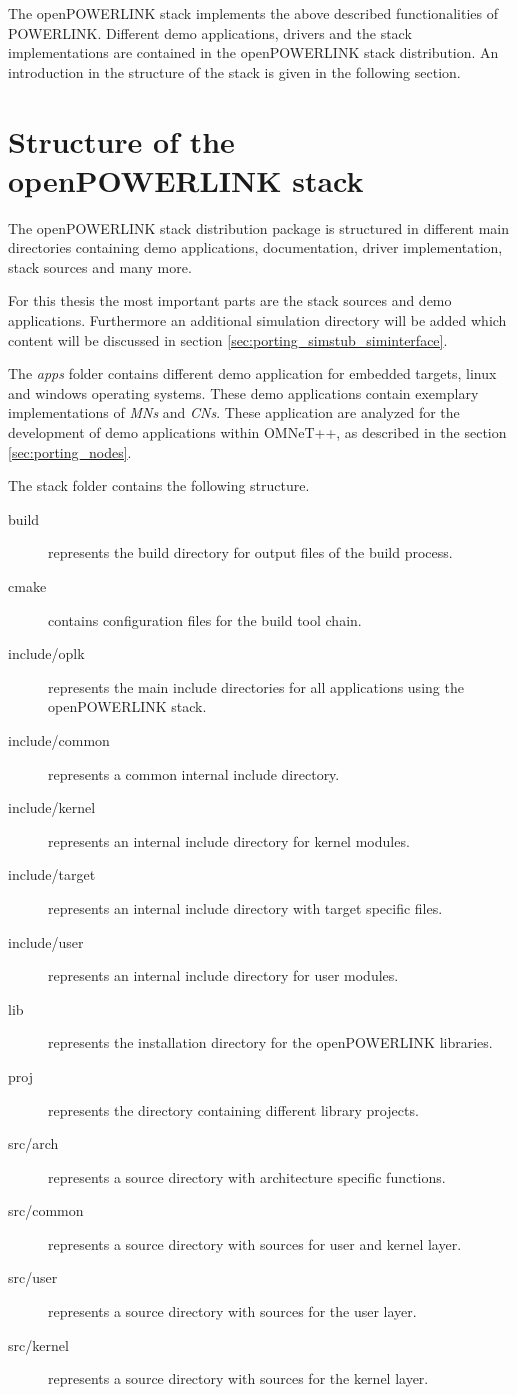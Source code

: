 The openPOWERLINK stack implements the above described functionalities of POWERLINK.
Different demo applications, drivers and the stack implementations are contained in the openPOWERLINK stack distribution.
An introduction in the structure of the stack is given in the following section.


\section{Structure of the openPOWERLINK stack}
\label{sec:oplk_structure}
The openPOWERLINK stack distribution package is structured in different main directories containing demo applications, documentation, driver implementation, stack sources and many more.

For this thesis the most important parts are the stack sources and demo applications.
Furthermore an additional simulation directory will be added which content will be discussed in section \ref{sec:porting_simstub_siminterface}.

The \emph{apps} folder contains different demo application for embedded targets, linux and windows operating systems.
These demo applications contain exemplary implementations of \emph{MNs} and \emph{CNs}.
These application are analyzed for the development of demo applications within OMNeT++, as described in the section \ref{sec:porting_nodes}.

The stack folder contains the following structure. \cite[Directory Structure]{openpowerlink_doc}
\begin{description}
    \item[build] represents the build directory for output files of the build process.
    \item[cmake] contains configuration files for the build tool chain.
    \item[include/oplk] represents the main include directories for all applications using the openPOWERLINK stack.
    \item[include/common] represents a common internal include directory.
    \item[include/kernel] represents an internal include directory for kernel modules.
    \item[include/target] represents an internal include directory with target specific files.
    \item[include/user] represents an internal include directory for user modules.
    \item[lib] represents the installation directory for the openPOWERLINK libraries.
    \item[proj] represents the directory containing different library projects.
    \item[src/arch] represents a source directory with architecture specific functions.
    \item[src/common] represents a source directory with sources for user and kernel layer.
    \item[src/user] represents a source directory with sources for the user layer.
    \item[src/kernel] represents a source directory with sources for the kernel layer.
\end{description}

